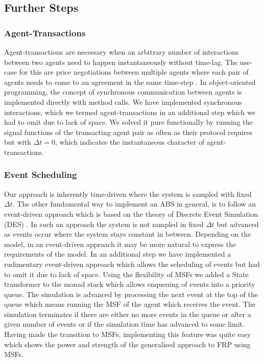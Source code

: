 







\subsection{Further Steps}
\subsubsection{Agent-Transactions}
Agent-transactions are necessary when an arbitrary number of interactions between two agents need to happen instantaneously without time-lag. The use-case for this are price negotiations between multiple agents where each pair of agents needs to come to an agreement in the same time-step \cite{epstein_growing_1996}. In object-oriented programming, the concept of synchronous communication between agents is implemented directly with method calls. We have implemented synchronous interactions, which we termed agent-transactions in an additional step which we had to omit due to lack of space. We solved it pure functionally by running the signal functions of the transacting agent pair as often as their protocol requires but with $\Delta t=0$, which indicates the instantaneous character of agent-transactions.

\subsubsection{Event Scheduling}
Our approach is inherently time-driven where the system is sampled with fixed $\Delta t$. The other fundamental way to implement an ABS in general, is to follow an event-driven approach \cite{meyer_event-driven_2014} which is based on the theory of Discrete Event Simulation (DES) \cite{zeigler_theory_2000}. In such an approach the system is not sampled in fixed $\Delta t$ but advanced as events occur where the system stays constant in between. Depending on the model, in an event-driven approach it may be more natural to express the requirements of the model. In an additional step we have implemented a rudimentary event-driven approach which allows the scheduling of events but had to omit it due to lack of space. Using the flexibility of MSFs we added a State transformer to the monad stack which allows enqueuing of events into a priority queue. The simulation is advanced by processing the next event at the top of the queue which means running the MSF of the agent which receives the event. The simulation terminates if there are either no more events in the queue or after a given number of events or if the simulation time has advanced to some limit. Having made the transition to MSFs, implementing this feature was quite easy which shows the power and strength of the generalised approach to FRP using MSFs.

